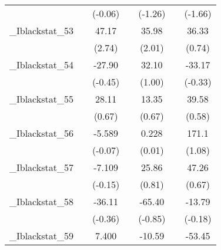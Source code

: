 {\begin{tabular}{l*{6}{c}}
            &                     &     (-0.06)         &                     &     (-1.26)         &                     &     (-1.66)         \\
[1em]
\_Iblackstat\_53&                     &       47.17\sym{**} &                     &       35.98         &                     &       36.33         \\
            &                     &      (2.74)         &                     &      (2.01)         &                     &      (0.74)         \\
[1em]
\_Iblackstat\_54&                     &      -27.90         &                     &       32.10         &                     &      -33.17         \\
            &                     &     (-0.45)         &                     &      (1.00)         &                     &     (-0.33)         \\
[1em]
\_Iblackstat\_55&                     &       28.11         &                     &       13.35         &                     &       39.58         \\
            &                     &      (0.67)         &                     &      (0.67)         &                     &      (0.58)         \\
[1em]
\_Iblackstat\_56&                     &      -5.589         &                     &       0.228         &                     &       171.1         \\
            &                     &     (-0.07)         &                     &      (0.01)         &                     &      (1.08)         \\
[1em]
\_Iblackstat\_57&                     &      -7.109         &                     &       25.86         &                     &       47.26         \\
            &                     &     (-0.15)         &                     &      (0.81)         &                     &      (0.67)         \\
[1em]
\_Iblackstat\_58&                     &      -36.11         &                     &      -65.40         &                     &      -13.79         \\
            &                     &     (-0.36)         &                     &     (-0.85)         &                     &     (-0.18)         \\
[1em]
\_Iblackstat\_59&                     &       7.400         &                     &      -10.59         &                     &      -53.45         \\

\end{tabular}}

